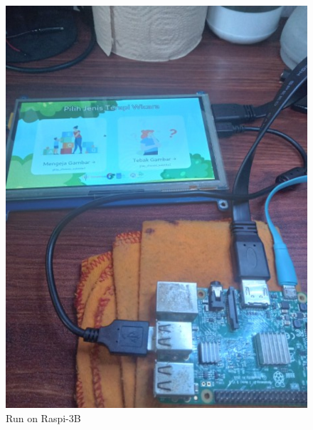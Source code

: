 \documentclass{article} %
\begin{document}
	\begin{figure}[!ht]                                  %
		\centering                                       %
		
		\includegraphics[width=350pt]{images/on_raspi}
		
		\caption{Run on Raspi-3B}                         %
	\end{figure}
\end{document}
